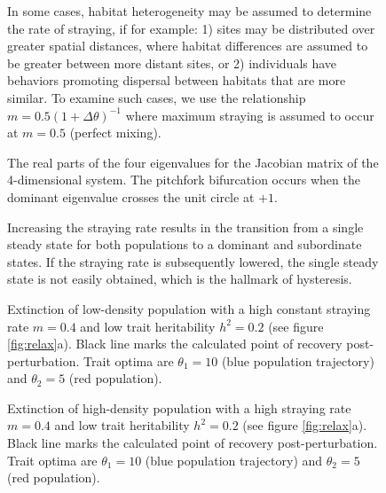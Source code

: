 \documentclass{revtex4}
\begin{document}
\begin{figure}
  \captionsetup{justification=raggedright,
singlelinecheck=false
}
\centering
\caption{
In some cases, habitat heterogeneity may be assumed to determine the rate of straying, if for example:
1) sites may be distributed over greater spatial distances, where habitat differences are assumed to be greater between more distant sites, or 2) individuals have behaviors promoting dispersal between habitats that are more similar. To examine such cases, we use the relationship $m= 0.5(1 + \Delta\theta)^{-1}$ where maximum straying is assumed to occur at $m=0.5$ (perfect mixing).
} \label{fig:mthetarelation}
\end{figure}

\begin{figure}
  \captionsetup{justification=raggedright,
singlelinecheck=false
}
\centering
\caption{
The real parts of the four eigenvalues for the Jacobian matrix of the 4-dimensional system.
The pitchfork bifurcation occurs when the dominant eigenvalue crosses the unit circle at $+1$. 
} \label{fig:eigs}
\end{figure}

\begin{figure}
  \captionsetup{justification=raggedright,
singlelinecheck=false
}
\centering
\caption{
Increasing the straying rate results in the transition from a single steady state for both populations to a dominant and subordinate states. If the straying rate is subsequently lowered, the single steady state is not easily obtained, which is the hallmark of hysteresis.
} \label{fig:hysteresis}
\end{figure}



\begin{figure}
  \captionsetup{justification=raggedright,
singlelinecheck=false
}
\centering
\caption{
Extinction of low-density population with a high constant straying rate $m=0.4$ and low trait heritability $h^2=0.2$ (see figure \ref{fig:relax}a).
Black line marks the calculated point of recovery post-perturbation.
Trait optima are $\theta_1 = 10$ (blue population trajectory) and $\theta_2 = 5$ (red population).
} \label{fig:relaxtraj_ldlh}
\end{figure}

\begin{figure}
  \captionsetup{justification=raggedright,
singlelinecheck=false
}
\centering
\caption{
Extinction of high-density population with a high straying rate $m=0.4$ and low trait heritability $h^2=0.2$ (see figure \ref{fig:relax}a).
Black line marks the calculated point of recovery post-perturbation.
Trait optima are $\theta_1 = 10$ (blue population trajectory) and $\theta_2 = 5$ (red population).
} \label{fig:relaxtraj_hdlh}
\end{figure}
\end{document}
